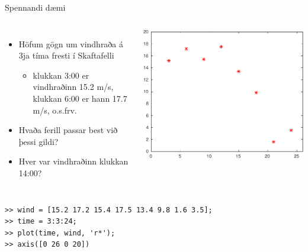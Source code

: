 \documentclass{beamer}
\begin{document}
\begin{frame}[fragile]{Spennandi dæmi}
\vspace{0.8cm}
\begin{columns}
\small
{}
\begin{itemize}
 \item Höfum gögn um vindhraða á 3ja tíma fresti í Skaftafelli 
 \begin{itemize}
  \item klukkan 3:00 er vindhraðinn 15.2 m/s, klukkan 6:00 er hann 17.7 m/s, o.s.frv.
 \end{itemize}
 \item Hvaða ferill passar best við þessi gildi?
 \item Hver var vindhraðinn klukkan 14:00?
\end{itemize}
\includegraphics[width=\linewidth]{Pics/vindur}
\end{columns}
\begin{verbatim}
>> wind = [15.2 17.2 15.4 17.5 13.4 9.8 1.6 3.5];
>> time = 3:3:24;
>> plot(time, wind, 'r*'); 
>> axis([0 26 0 20])
\end{verbatim}
\end{frame}
\end{document}
